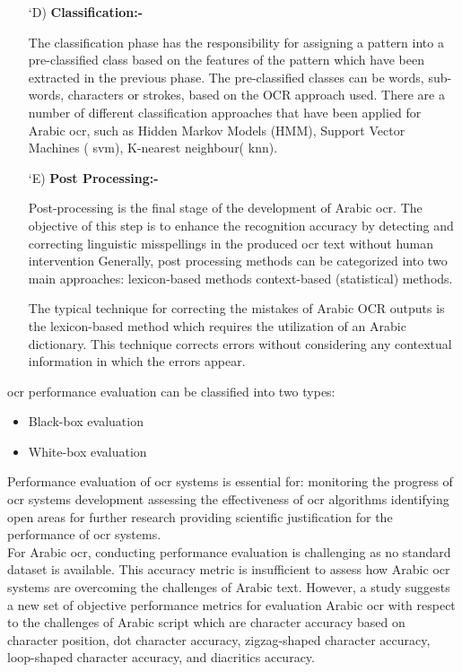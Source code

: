 \begin{itemize}[labelindent=1em,labelsep=0.25cm,leftmargin=*]
        \item[\char `D)] \textbf{Classification:-}
        
        The classification phase has the responsibility for assigning a pattern into a pre-classified class based on the features of the pattern which have been extracted in the previous phase. The pre-classified classes can be words, sub-words, characters or strokes, based on the OCR approach used. There are a number of different classification approaches that have been applied for Arabic  \acrshort{ocr}, such as Hidden Markov Models (HMM), Support Vector Machines ( \acrshort{svm}), K-nearest neighbour( \acrshort{knn}).
        
        \item[\char `E)] \textbf{Post Processing:-}
        
        Post-processing is the final stage of the development of Arabic \acrshort{ocr}. The objective of this step is to enhance the recognition accuracy by detecting and correcting linguistic misspellings in the produced \acrshort{ocr} text without human intervention Generally, post processing methods can be categorized into two main approaches: lexicon-based methods context-based (statistical) methods.

        The typical technique for correcting the mistakes of Arabic OCR outputs is the lexicon-based method which requires the utilization of an Arabic dictionary. This technique corrects errors without considering any contextual information in which the errors appear.

        \end{itemize}
        \acrshort{ocr} performance evaluation can be classified into two types:
        \begin{itemize}[itemsep=1pt, topsep=5pt]
            \item Black-box evaluation  
            \item White-box evaluation
        \end{itemize} 

        Performance evaluation of \acrshort{ocr} systems is essential for: monitoring the progress of \acrshort{ocr} systems development assessing the effectiveness of \acrshort{ocr} algorithms identifying open areas for further research providing scientific justification for the performance of \acrshort{ocr} systems.\\

For Arabic \acrshort{ocr}, conducting performance evaluation is challenging as no standard dataset is available. This accuracy metric is insufficient to assess how Arabic \acrshort{ocr} systems are overcoming the challenges of Arabic text. However, a study suggests a new set of objective performance metrics for evaluation Arabic \acrshort{ocr} with respect to the challenges of Arabic script which are character accuracy based on character position, dot character accuracy, zigzag-shaped character accuracy, loop-shaped character accuracy, and diacritics accuracy.

